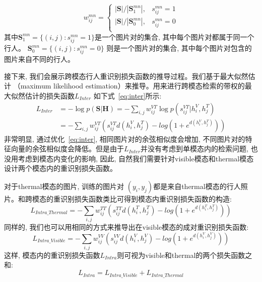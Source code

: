 \begin{equation}
  w^{mn}_{ij} = 
  \begin{cases}
  |\mathbf{S}|/|\mathbf{S}^{mn}_1|, &s^{mn}_{ij}=1\\
  |\mathbf{S}|/|\mathbf{S}^{mn}_0|, &s^{mn}_{ij}=0 \\
  \end{cases}
\end{equation}
其中$\mathbf{S}^{mn}_1 = \{(i,j): s^{mn}_{ij}=1\}$是一个图片对的集合, 其中每个图片对都属于同一个行人。 $\mathbf{S}^{mn}_0 = \{(i,j): s^{mn}_{ij}=0\}$ 则是一个图片对的集合, 其中每个图片对包含的图片来自不同的行人。\par
接下来, 我们会展示跨模态行人重识别损失函数的推导过程。我们基于最大似然估计 （maximum likelihood estimation）来推导。用来进行跨模态检索的带权的最大似然估计的损失函数$L_{Inter}$ 如下式~\ref{eq:inter}所示:
\begin{equation}
  \begin{aligned}
     L_{Inter} &= -\log{ p(\mathbf{S}|\mathbf{H})} 
      =  -\sum_{i, j}w^{VT}_{ij}\log{p(s^{VT}_{ij}|h_i^V,h_j^T)} \\
      &= -\sum_{i,j}w^{VT}_{ij}(s^{VT}_{ij}d(h_i^V,h_j^T)-log(1+e^{d(h_i^V,h_j^T)}))
 \end{aligned}
 \label{eq:inter}
  \end{equation}
非常明显, 通过优化~\ref{eq:inter}, 相同图片对的余弦相似度会增加, 不同图片对的特征向量的余弦相似度会降低。但是由于$L_{Inter}$并没有考虑到单模态内的检索问题, 也没用考虑到模态内变化的影响, 因此, 自然我们需要针对visible模态和thermal模态设计两个模态内的重识别损失函数。\par
对于thermal模态的图片, 训练的图片对 $(y_i, y_j)$都是来自thermal模态的行人照片。和跨模态的重识别损失函数类比可得到模态内重识别损失函数的构造:
\begin{equation}
  L_{Intra\_Thermal} = -\sum_{i,j}w^{TT}_{ij}(s^{TT}_{ij}d(h_i^T,h_j^T)-log(1+e^{d(h_i^T,h_j^T)}))
  \label{eq:intrathermal}
\end{equation}
同样的, 我们也可以用相同的方式来推导出在visible模态的成对重识别损失函数:
\begin{equation}
  L_{Intra\_Visible} = -\sum_{i,j}w^{VV}_{ij}(s^{VV}_{ij}d(h_i^V,h_j^V)-log(1+e^{d(h_i^V,h_j^V)}))
  \label{eq:intravisible}
\end{equation}
这样, 模态内的重识别损失函数$L_{Intra}$则可视为visible和thermal的两个损失函数之和:
\begin{equation}
  L_{Intra} = L_{Intra\_Visible} + L_{Intra\_Thermal}
\label{eq:Intra}
\end{equation}
